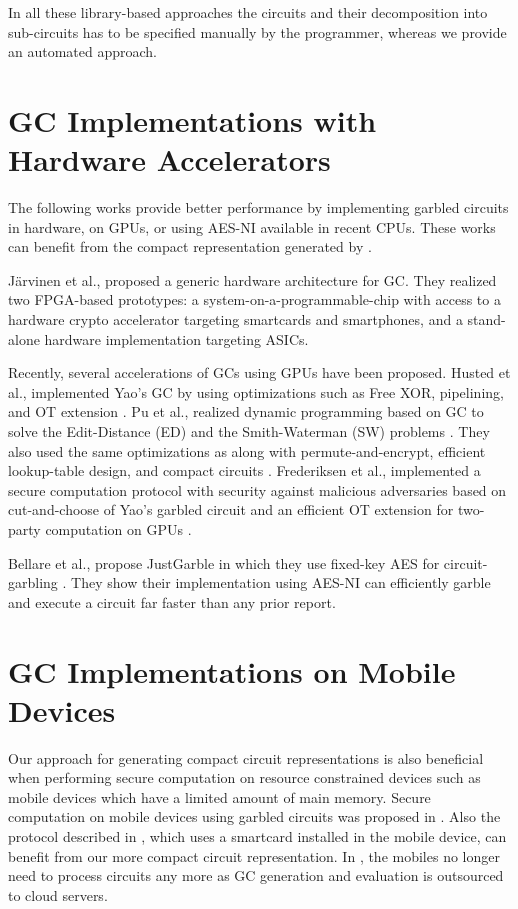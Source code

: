 In all these library-based approaches the circuits and their decomposition into sub-circuits has to be specified manually by the programmer, whereas we provide an automated approach.

\section{GC Implementations with Hardware Accelerators}
The following works provide better performance by implementing garbled circuits in hardware, on GPUs, or using AES-NI available in recent CPUs.
These works can benefit from the compact representation generated by \sys.

J\"arvinen et al., \cite{jarvinen2010garbled} proposed a generic hardware architecture for GC.
They realized two FPGA-based prototypes: a system-on-a-programmable-chip with access to a hardware crypto accelerator targeting smartcards and smartphones, and a stand-alone hardware implementation targeting ASICs.

Recently, several accelerations of GCs using GPUs have been proposed.
Husted et al., implemented Yao's GC by using optimizations such as Free XOR, pipelining, and OT extension \cite{husted2013gpu}.
Pu et al., realized dynamic programming based on GC to solve the Edit-Distance (ED) and the Smith-Waterman (SW) problems \cite{pu2013computing}.
They also used the same optimizations as \cite{husted2013gpu} along with permute-and-encrypt, efficient lookup-table design, and compact circuits \cite{pu2013computing}.
Frederiksen et al., implemented a secure computation protocol with security against malicious adversaries based on cut-and-choose of Yao's garbled circuit and an efficient OT extension for two-party computation on GPUs \cite{frederiksen2013fast}.

Bellare et al., propose JustGarble in which they use fixed-key AES for circuit-garbling \cite{bellare2013efficient}.
They show their implementation using AES-NI can efficiently garble and execute a circuit far faster than any prior report.

\section{GC Implementations on Mobile Devices}
Our approach for generating compact circuit representations is also beneficial when performing secure computation on resource constrained devices such as mobile devices which have a limited amount of main memory.
Secure computation on mobile devices using garbled circuits was proposed in \cite{huang2011privacy}.
Also the protocol described in \cite{demmler2014ad}, which uses a smartcard installed in the mobile device, can benefit from our more compact circuit representation.
In \cite{carter2016secure, carter2014whitewash}, the mobiles no longer need to process circuits any more as GC generation and evaluation is outsourced to cloud servers.


